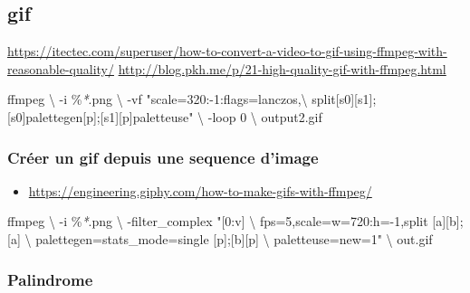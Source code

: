 \documentclass[
  french,
]{book}
\newenvironment{Shaded}{\begin{snugshade}}{\end{snugshade}}
\newcommand{\DataTypeTok}[1]{\textcolor[rgb]{0.13,0.29,0.53}{#1}}
\newcommand{\ExtensionTok}[1]{#1}
\newcommand{\NormalTok}[1]{#1}
\newcommand{\PreprocessorTok}[1]{\textcolor[rgb]{0.56,0.35,0.01}{\textit{#1}}}
\newcommand{\StringTok}[1]{\textcolor[rgb]{0.31,0.60,0.02}{#1}}
\providecommand{\tightlist}{%
  \setlength{\itemsep}{0pt}\setlength{\parskip}{0pt}}
\begin{document}
\hypertarget{gif}{%
\subsection{gif}\label{gif}}

\url{https://itectec.com/superuser/how-to-convert-a-video-to-gif-using-ffmpeg-with-reasonable-quality/}
\url{http://blog.pkh.me/p/21-high-quality-gif-with-ffmpeg.html}

\begin{Shaded}
\begin{Highlighting}[]
\ExtensionTok{ffmpeg}  \DataTypeTok{\textbackslash{}}
\NormalTok{{-}i \%}\PreprocessorTok{*}\NormalTok{.png }\DataTypeTok{\textbackslash{}}
\NormalTok{{-}vf }\StringTok{"scale=320:{-}1:flags=lanczos,}\DataTypeTok{\textbackslash{}}
\StringTok{split[s0][s1];[s0]palettegen[p];[s1][p]paletteuse"} \DataTypeTok{\textbackslash{}}
\NormalTok{{-}loop 0 }\DataTypeTok{\textbackslash{}}
\NormalTok{output2.gif}
\end{Highlighting}
\end{Shaded}

\hypertarget{cruxe9er-un-gif-depuis-une-sequence-dimage}{%
\subsubsection{Créer un gif depuis une sequence d'image}\label{cruxe9er-un-gif-depuis-une-sequence-dimage}}

\begin{itemize}
\tightlist
\item
  \url{https://engineering.giphy.com/how-to-make-gifs-with-ffmpeg/}
\end{itemize}

\begin{Shaded}
\begin{Highlighting}[]
\ExtensionTok{ffmpeg} \DataTypeTok{\textbackslash{}}
\NormalTok{{-}i \%}\PreprocessorTok{*}\NormalTok{.png }\DataTypeTok{\textbackslash{}}
\NormalTok{{-}filter\_complex }\StringTok{"[0:v] }\DataTypeTok{\textbackslash{}}
\StringTok{fps=5,scale=w=720:h={-}1,split [a][b];[a] }\DataTypeTok{\textbackslash{}}
\StringTok{palettegen=stats\_mode=single [p];[b][p] }\DataTypeTok{\textbackslash{}}
\StringTok{paletteuse=new=1"} \DataTypeTok{\textbackslash{}}
\NormalTok{out.gif}
\end{Highlighting}
\end{Shaded}

\hypertarget{palindrome}{%
\subsubsection{Palindrome}\label{palindrome}}
\end{document}

